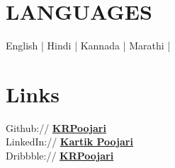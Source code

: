 \documentclass[]{resume}
\begin{document}
\begin{minipage}[t]{0.33\textwidth}

\section{LANGUAGES}
English | 
Hindi | 
Kannada |  
Marathi | 

\bigskip
\bigskip


\section{Links}
Github:// \href{https://github.com/KRPoojari}{\bf KRPoojari} \\
LinkedIn:// \href{https://www.linkedin.com/in/kartik-poojari-74250b201/}{\bf Kartik Poojari} \\
Dribbble:// \href{https://dribbble.com/KRPoojari}{\bf KRPoojari} \\

\end{minipage}
\end{document}
